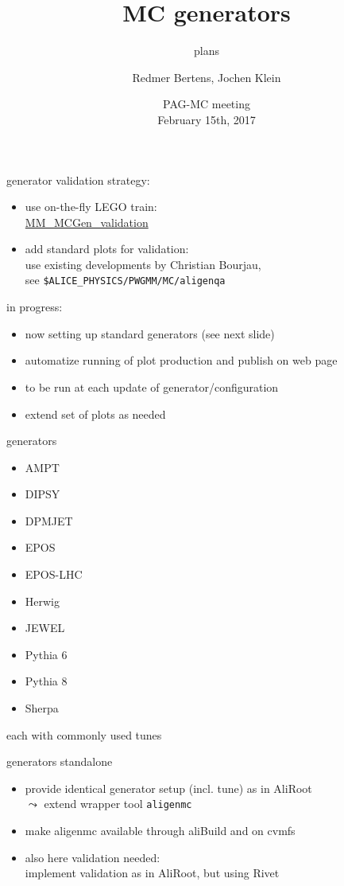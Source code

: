 \documentclass[table]{beamer}
\title{MC generators}
\subtitle{plans}
\author[Redmer, jkl]{Redmer Bertens\inst{1}, Jochen Klein\inst{2}}
\institute[]{
  \inst{1} University of Tennessee, Knoxville \and
  \inst{2} CERN, Geneva
}
\date[PAG-MC meeting, Feb 15, 2017]{
  PAG-MC meeting\\[.2cm]
  February 15th, 2017
}
\begin{document}
{
  \begin{frame}
    \titlepage
  \end{frame}
}

\begin{frame}{generator validation}
  strategy:
  \begin{itemize}
    \setlength{\itemsep}{.25cm}
  \item use on-the-fly LEGO train:\\
    \href{https://alimonitor.cern.ch/trains/train.jsp?train_id=107}{MM\_MCGen\_validation}
  \item add standard plots for validation:\\[.2cm]
    use existing developments by Christian Bourjau,\\
    see \texttt{\$ALICE\_PHYSICS/PWGMM/MC/aligenqa}
  \end{itemize}
  \vspace{.25cm}
  in progress:
  \begin{itemize}
    \setlength{\itemsep}{.25cm}
  \item now setting up standard generators (see next slide)
  \item automatize running of plot production and publish on web page
  \item to be run at each update of generator/configuration
  \item extend set of plots as needed
  \end{itemize}
\end{frame}

\begin{frame}{generators}
  \begin{itemize}
    \setlength{\itemsep}{.25cm}
  \item AMPT
  \item DIPSY
  \item DPMJET
  \item EPOS
  \item EPOS-LHC
  \item Herwig
  \item JEWEL
  \item Pythia 6
  \item Pythia 8
  \item Sherpa
  \end{itemize}
  each with commonly used tunes
\end{frame}

\begin{frame}{generators standalone}
  \begin{itemize}
    \setlength{\itemsep}{.25cm}
  \item provide identical generator setup (incl. tune) as in AliRoot\\
    $\leadsto$ extend wrapper tool \texttt{aligenmc}
  \item make aligenmc available through aliBuild and on cvmfs
  \item also here validation needed:\\
    implement validation as in AliRoot, but using Rivet
  \end{itemize}
\end{frame}
\end{document}
